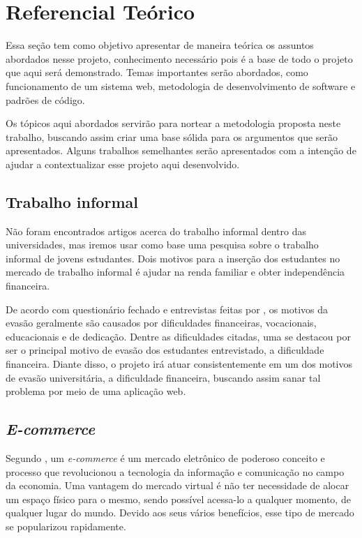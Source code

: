\chapter{Referencial Teórico}

Essa seção tem como objetivo apresentar de maneira teórica os assuntos abordados nesse projeto, conhecimento necessário pois é a base de todo o projeto que aqui será demonstrado. Temas importantes serão abordados, como funcionamento de um sistema web, metodologia de desenvolvimento de software e padrões de código. \par
Os tópicos aqui abordados servirão para nortear a metodologia proposta neste trabalho, buscando assim criar uma base sólida para os argumentos que serão apresentados. Alguns trabalhos semelhantes serão apresentados com a intenção de ajudar a contextualizar esse projeto aqui desenvolvido.


\section{Trabalho informal}\label{trabalho_informal}
Não foram encontrados artigos acerca do trabalho informal dentro das universidades, mas iremos usar como base uma pesquisa sobre o trabalho informal de jovens estudantes. Dois motivos para a inserção dos estudantes no mercado de trabalho informal é ajudar na renda familiar e obter independência financeira\cite{ferreira2009trabalhojovem}. \par
De acordo com questionário fechado e entrevistas feitas por \cite{ribeiro2005evasao}, os motivos da evasão geralmente são causados por dificuldades financeiras, vocacionais, educacionais e de dedicação. Dentre as dificuldades citadas, uma se destacou por ser o principal motivo de evasão dos estudantes entrevistado, a dificuldade financeira. Diante disso, o projeto irá atuar consistentemente em um dos motivos de evasão universitária, a dificuldade financeira, buscando assim sanar tal problema por meio de uma aplicação web.


\section{\textit{E-commerce}}\label{ecommerce}

Segundo \cite{nanehkaran2013introduction}, um \textit{e-commerce} é um mercado eletrônico de poderoso conceito e processo que revolucionou a tecnologia da informação e comunicação no campo da economia. Uma vantagem do mercado virtual é não ter necessidade de alocar um espaço físico para o mesmo, sendo possível acessa-lo a qualquer momento, de qualquer lugar do mundo. Devido aos seus vários benefícios, esse tipo de mercado se popularizou rapidamente.

